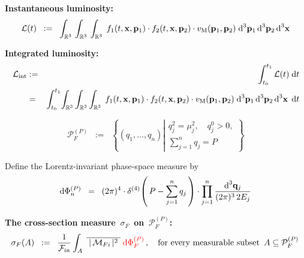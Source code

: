 \vskip 0.2cm
\noindent
\textbf{Instantaneous luminosity:}
\begin{equation*}
\mathcal{L}(t)
\;\; := \;\;
    \int_{\mathbb{R}^{3}}\,
    \int_{\mathbb{R}^{3}}\,
    \int_{\mathbb{R}^{3}}\;
        f_{1}(t,\mathbf{x},\mathbf{p}_{1})
        \cdot
        f_{2}(t,\mathbf{x},\mathbf{p}_{2})
        \cdot
        v_{\textnormal{M}}(\mathbf{p}_{1},\mathbf{p}_{2})
        \;
        \textnormal{d}^{3}\mathbf{p}_{1}\,
        \textnormal{d}^{3}\mathbf{p}_{2}\,
        \textnormal{d}^{3}\mathbf{x}
\end{equation*}

\vskip 0.2cm
\noindent
\textbf{Integrated luminosity:}
\begin{eqnarray*}
\displaystyle
\mathcal{L}_{\textnormal{int}}
& := &
    \int_{t_{0}}^{t_{1}}
        \mathcal{L}(t)
        \;\textnormal{d} t
\\
& = &
    \int_{t_{0}}^{t_{1}}\!
    \int_{\mathbb{R}^{3}}
    \int_{\mathbb{R}^{3}}
    \int_{\mathbb{R}^{3}}\;
        f_{1}(t,\mathbf{x},\mathbf{p}_{1})
        \cdot
        f_{2}(t,\mathbf{x},\mathbf{p}_{2})
        \cdot
        v_{\textnormal{M}}(\mathbf{p}_{1},\mathbf{p}_{2})
        \;
        \textnormal{d}^{3}\mathbf{p}_{1}\,
        \textnormal{d}^{3}\mathbf{p}_{2}\,
        \textnormal{d}^{3}\mathbf{x}\,
        \;\textnormal{d} t
\end{eqnarray*}

\begin{equation*}
\mathcal P_{F}^{(P)}
\;\; := \;\;
    \left\{
        (q_1,\ldots,q_n)
        \left\vert
            \begin{array}{c}
            q_j^2=\mu_j^2,\quad q_j^0>0,\\[2pt]
            \displaystyle\sum_{j=1}^{n}q_j=P
            \end{array}
            \right.
        \right\}
\end{equation*}

\vskip 0.2cm
\noindent
Define the Lorentz-invariant phase-space measure by
\begin{equation*}
\textnormal{d}\Phi_{n}^{(P)}
\;\; = \;\;
    (2\pi)^{4}
    \cdot
    \delta^{(4)}\!\left(\,P-\sum_{j=1}^{n}q_{j}\,\right)
    \cdot
    \prod_{j=1}^{n}\dfrac{\textnormal{d}^{3}\mathbf{q}_{j}}{(2\pi)^{3}\,2 E_{j}}
\end{equation*}

\vskip 0.2cm
\noindent
\textbf{The cross-section measure \,$\sigma_{F}$\, on \,$\mathcal{P}_{F}^{(P)}$:}
\begin{equation*}
\sigma_{F}(A)
\;\; := \;\;
    \dfrac{1}{\mathcal{F}_{\textnormal{in}}}
    \int_{A}\;
        \overline{{\color{white}.}\vert\,\mathcal{M}_{Fi}\,\vert^{2}{\color{white}.}}
        \;{\color{red}\d\Phi_{F}^{(P)}}\,,
\quad
\textnormal{for every measurable subset \,$A\subseteq\mathcal{P}_{F}^{(P)}$\,}
\end{equation*}

